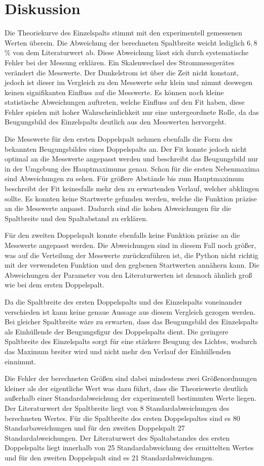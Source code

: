 \section{Diskussion}
\label{sec:Diskussion}

Die Theoriekurve des Einzelspalts stimmt mit den experimentell gemessenen Werten überein. Die Abweichung der berechneten Spaltbreite weicht lediglich
$6,8\,$\% von dem Literaturwert ab. Diese Abweichung lässt sich durch systematische Fehler bei der Messung erklären. Ein Skalenwechsel des
Strommessgerätes verändert die Messwerte. Der Dunkelstrom ist über die Zeit nicht konstant, jedoch ist dieser im Vergleich zu
den Messwerte sehr klein und nimmt deswegen keinen signifikanten Einfluss auf die Messwerte. Es können noch kleine
statistische Abweichungen auftreten, welche Einfluss auf den Fit haben, diese Fehler spielen mit hoher Wahrscheinlichkeit nur eine untergeordnete
Rolle, da das Beugungsbild des Einzelspalts deutlich aus den Messwerten hervorgeht.

Die Messwerte für den ersten Doppelspalt nehmen ebenfalls die Form des bekannten Beugungsbildes eines Doppelspalts an. Der Fit konnte jedoch nicht
optimal an die Messwerte angepasst werden und beschreibt das Beugungsbild nur in der Umgebung des Hauptmaximums genau. Schon für
die ersten Nebenmaxima sind Abweichungen zu sehen. Für größere Abstände bis zum Hauptmaximum beschreibt der Fit keinesfalls mehr den zu erwartenden Verlauf, welcher
abklingen sollte. Es konnten keine Startwerte gefunden werden, welche die Funktion präzise an die Messwerte anpasst.
Dadurch sind die hohen Abweichungen für die Spaltbreite und den Spaltabstand zu erklären.

Für den zweiten Doppelspalt konnte ebenfalls keine Funktion präzise an die Messwerte angepasst werden. Die Abweichungen sind in diesem Fall noch größer,
was auf die Verteilung der Messwerte zurückzuführen ist, die Python nicht richtig mit der verwendeten Funktion und den
gegbenen Startwerten annähern kann.
Die Abweichungen der Parameter von den Literaturwerten ist dennoch ähnlich groß wie bei dem ersten Doppelspalt.


Da die Spaltbreite des ersten Doppelspalts und des Einzelspalts voneinander verschieden ist kann keine genaue Aussage aus diesem Vergleich gezogen werden.
Bei gleicher Spaltbreite wäre zu erwarten, dass das Beugungsbild des Einzelspalts als Einhüllende der Beugungsfigur des Doppelspalts dient.
Die geringere Spaltbreite des Einzelspalts sorgt für eine stärkere Beugung des Lichtes, wodurch das Maximum breiter  wird und nicht mehr den
Verlauf der Einhüllenden einnimmt.

Die Fehler der berechneten Größen sind dabei mindestens zwei Größenordnungen kleiner als der eigentliche Wert was dazu führt,
dass die Theoriewerte deutlich außerhalb einer Standardabweichung der experimentell bestimmten Werte liegen. Der
Literaturwert der Spaltbreite liegt von 8 Standardabweichungen des berechneten Wertes. Für die
Spaltbreite des ersten Doppelspaltes sind es 80 Standarbaweichungen und für den zweiten Doppelspalt 27 Standardabweichungen.
Der Literaturwert des Spaltabstandes des ersten Doppelspalts liegt innerhalb von 25 Standardabweichung des
ermittelten Wertes und für den zweiten Doppelspalt sind es 21 Standardabweichungen.
